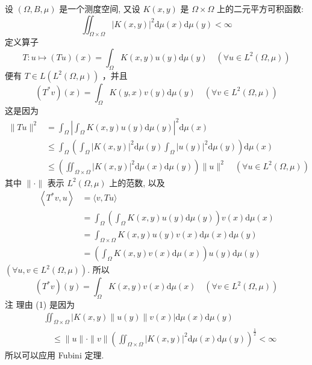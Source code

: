 \documentclass[lang=cn,newtx,10pt,scheme=chinese,thmcnt=chapter]{elegantbook}
\newcommand{\dif}{\mathrm{d}}
\begin{document}
\begin{example}
设 $(\Omega, B , \mu)$ 是一个测度空间, 又设 $K(x, y)$ 是 $\Omega \times \Omega$ 上的二元平方可积函数:
\begin{equation*}
\iint_{\Omega \times \Omega}|K(x, y)|^2 \dif \mu(x) \dif \mu(y)<\infty
\end{equation*}
定义算子
\begin{equation*}
T: u \mapsto(T u)(x)=\int_{\Omega} K(x, y) u(y) \dif \mu(y) \quad\left(\forall u \in L^2(\Omega, \mu)\right)
\end{equation*}
便有 $T \in L \left(L^2(\Omega, \mu)\right)$ ，并且
\begin{equation*}
\left(T^* v\right)(x)=\int_{\Omega} K(y, x) v(y) \dif \mu(y) \quad\left(\forall v \in L^2(\Omega, \mu)\right)
\end{equation*}这是因为
\begin{equation*}
\begin{aligned}
\|T u\|^2 & =\int_{\Omega}\left|\int_{\Omega} K(x, y) u(y) \dif \mu(y)\right|^2 \dif \mu(x) \\
& \leqslant \int_{\Omega}\left(\int_{\Omega}|K(x, y)|^2 \dif \mu(y) \int_{\Omega}|u(y)|^2 \dif \mu(y)\right) \dif \mu(x) \\
& \leqslant\left(\iint_{\Omega \times \Omega}|K(x, y)|^2 \dif \mu(x) \dif \mu(y)\right)\|u\|^2 \quad\left(\forall u \in L^2(\Omega, \mu)\right)
\end{aligned}
\end{equation*}
其中 $\|\cdot\|$ 表示 $L^2(\Omega, \mu)$ 上的范数, 以及
\begin{equation*}
\begin{aligned}
\left\langle T^* v, u\right\rangle & =\langle v, T u\rangle \\
& =\int_{\Omega}\left(\int_{\Omega} K(x, y) u(y) \dif \mu(y)\right) v(x) \dif \mu(x) \\
& =\int_{\Omega \times \Omega} K(x, y) u(y) v(x) \dif \mu(x) \dif \mu(y) \\
& =\left(\int_{\Omega} K(x, y) v(x) \dif \mu(x)\right) u(y) \dif \mu(y)
\end{aligned}
\end{equation*}
$\left(\forall u, v \in L^2(\Omega, \mu)\right)$. 所以
\begin{equation*}
\left(T^* v\right)(y)=\int_{\Omega} K(x, y) v(x) \dif \mu(x) \quad\left(\forall v \in L^2(\Omega, \mu)\right)
\end{equation*}
注 理由 (1) 是因为
\begin{equation*}
\begin{aligned}
& \iint_{\Omega \times \Omega}|K(x, y)\|u(y)\| v(x)| \dif \mu(x) \dif \mu(y) \\
& \quad \leqslant\|u\| \cdot\|v\|\left(\iint_{\Omega \times \Omega}|K(x, y)|^2 \dif \mu(x) \dif \mu(y)\right)^{\frac{1}{2}}<\infty
\end{aligned}
\end{equation*}
所以可以应用 Fubini 定理.
\end{example}
\end{document}
